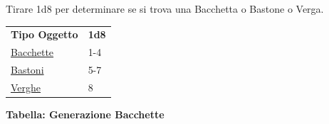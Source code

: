 \begin{multicols}{2}
{Tirare 1d8 per determinare se si trova una Bacchetta o Bastone o Verga.

\medskip

{\small\begin{tabular}{ll}
\textbf{Tipo Oggetto}&\textbf{1d8}\\
\hyperlink{Bacchette}{Bacchette}&1-4\\
\hyperlink{Bastoni}{Bastoni}&5-7\\
\hyperlink{Verghe}{Verghe}&8\\
\end{tabular}}

\medskip

\textbf{Tabella: Generazione Bacchette}\hypertarget{Bacchette}{}

\medskip

}
\end{multicols}
